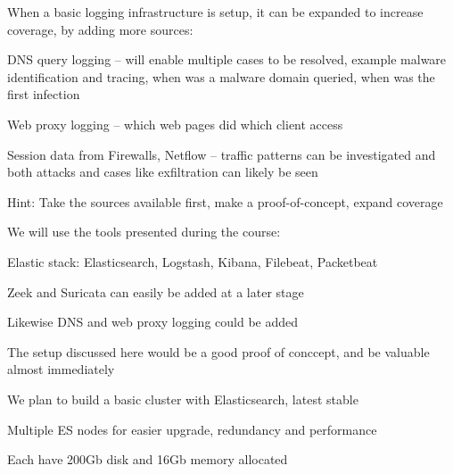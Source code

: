 \documentclass[Screen16to9,17pt]{foils}
\begin{document}
When a basic logging infrastructure is setup, it can be expanded to increase coverage, by
adding more sources:

\begin{list2}
\item DNS query logging -- will enable multiple cases to be resolved, example malware identification and tracing, when was a malware domain queried, when was the first infection
\item Web proxy logging -- which web pages did which client access
\item Session data from Firewalls, Netflow -- traffic patterns can be investigated and both attacks and cases like exfiltration can likely be seen

\end{list2}

Hint: Take the sources available first, make a proof-of-concept, expand coverage







\begin{quote}

\end{quote}

We will use the tools presented during the course:
\begin{list2}
\item Elastic stack: Elasticsearch, Logstash, Kibana, Filebeat, Packetbeat
\item Zeek and Suricata can easily be added at a later stage
\item Likewise DNS and web proxy logging could be added
\end{list2}

\vskip 1cm

The setup discussed here would be a good proof of conccept, and be valuable almost immediately




\begin{list2}
\item We plan to build a basic cluster with Elasticsearch, latest stable
\item Multiple ES nodes for easier upgrade, redundancy and performance
\item Each have 200Gb disk and 16Gb memory allocated
\end{list2}
\end{document}
